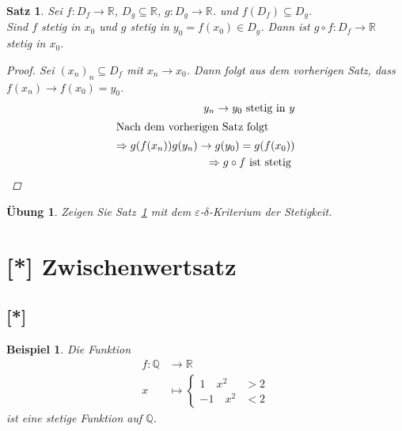 \documentclass[11pt, twoside, a4paper]{article}
\theoremstyle{plain}
\newtheorem{satz}[blockelement]{Satz}
\newtheorem{uebung}[blockelement]{Übung}
\newtheorem{beispiel}[blockelement]{Beispiel}
\newcommand{\impl}[0]{\Rightarrow{}}
\newcommand{\fromto}{\rightarrow{}}
\newcommand{\R}{\mathbb{R}}
\newcommand{\Q}{\mathbb{Q}}
\begin{document}
    \begin{satz} %
        \label{satz:verkettung-stetigkeit}
        Sei $f: D_f \fromto\R$, $D_g\subseteq\R$, $g: D_g\fromto\R$. und $f(D_f)\subseteq D_g$.\\
        Sind $f$ stetig in $x_0$ und $g$ stetig in $y_0=f(x_0)\in D_g$. Dann ist $g\circ f: D_f\fromto\R$ stetig in $x_0$.

        \begin{proof}
            Sei $(x_n)_n\subseteq D_f$ mit $x_n\fromto x_0$. Dann folgt aus dem vorherigen Satz, dass $f(x_n) \fromto f(x_0) = y_0$.\\
            \begin{align*}
                y_n\fromto y_0 \text{ stetig in } y\\
                \intertext{Nach dem vorherigen Satz folgt}
                \impl g(f(x_n)) g(y_n) \fromto g(y_0) = g(f(x_0))\\
                \impl g\circ f \text{ ist stetig }
            \end{align*}
        \end{proof}
    \end{satz}

    \begin{uebung}
        Zeigen Sie Satz~\ref{satz:verkettung-stetigkeit} mit dem $\varepsilon$-$\delta$-Kriterium der Stetigkeit.
    \end{uebung}

    \newpage


    \section{[*] Zwischenwertsatz}

    \subsection{[*]}
    \thispagestyle{pagenumberonly}


    \begin{beispiel}
        Die Funktion
        \begin{align*}
            f: \Q &\fromto \R\\
            x &\mapsto
            \begin{cases}
                1\quad x^2 &> 2\\
                -1\quad x^2 &< 2
            \end{cases}
        \end{align*}
        ist eine stetige Funktion auf $\Q$.
    \end{beispiel}
\end{document}
